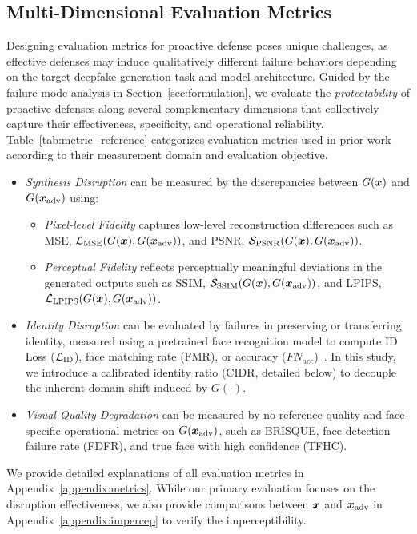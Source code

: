 \documentclass{article}
\begin{document}
\subsection{Multi-Dimensional Evaluation Metrics}
\label{subsec:evaluation}
Designing evaluation metrics for proactive defense poses unique challenges, as effective defenses may induce qualitatively different failure behaviors depending on the target deepfake generation task and model architecture. Guided by the failure mode analysis in Section~\ref{sec:formulation}, we evaluate the \emph{protectability} of proactive defenses along several complementary dimensions that collectively capture their effectiveness, specificity, and operational reliability. Table~\ref{tab:metric_reference} categorizes evaluation metrics used in prior work according to their measurement domain and evaluation objective.
\begin{itemize}[leftmargin=*, nosep]
    \item \emph{Synthesis Disruption} can be measured by the discrepancies between $G({\bm{x}})$ and $G({\bm{x}}_{\mathrm{adv}})$ using:
    \begin{itemize}[leftmargin=*, nosep]
        \item \emph{Pixel-level Fidelity} captures low-level reconstruction differences such as MSE, ${\mathcal{L}}_\mathrm{MSE}(G({\bm{x}}), G({\bm{x}}_{\mathrm{adv}}))$, and PSNR, ${\mathcal{S}}_\mathrm{PSNR}(G({\bm{x}}), G({\bm{x}}_{\mathrm{adv}}))$.
        \item \emph{Perceptual Fidelity} reflects perceptually meaningful deviations in the generated outputs such as SSIM, ${\mathcal{S}}_{\mathrm{SSIM}}(G({\bm{x}}), G({\bm{x}}_{\mathrm{adv}}))$, and LPIPS, ${\mathcal{L}}_{\mathrm{LPIPS}}(G({\bm{x}}), G({\bm{x}}_{\mathrm{adv}}))$.
    \end{itemize}
    \item \emph{Identity Disruption} can be evaluated by failures in preserving or transferring identity, measured using a pretrained face recognition model to compute ID Loss (${\mathcal{L}}_{\mathrm{ID}}$), face matching rate ($\mathrm{FMR}$), or accuracy ($FN_{acc}$)~\cite{deng2019arcface, wang2025faceswapguard, zhang2024dual}. In this study, we introduce a calibrated identity ratio (CIDR, detailed below) to decouple the inherent domain shift induced by $G(\cdot)$. 
    \item \emph{Visual Quality Degradation} can be measured by no-reference quality and face-specific operational metrics on $G({\bm{x}}_{\mathrm{adv}})$, such as BRISQUE, face detection failure rate (FDFR), and true face with high confidence (TFHC).
\end{itemize}
We provide detailed explanations of all evaluation metrics in Appendix~\ref{appendix:metrics}. While our primary evaluation focuses on the disruption effectiveness, we also provide comparisons between ${\bm{x}}$ and ${\bm{x}}_{\mathrm{adv}}$ in Appendix~\ref{appendix:impercep} to verify the imperceptibility.
\end{document}
